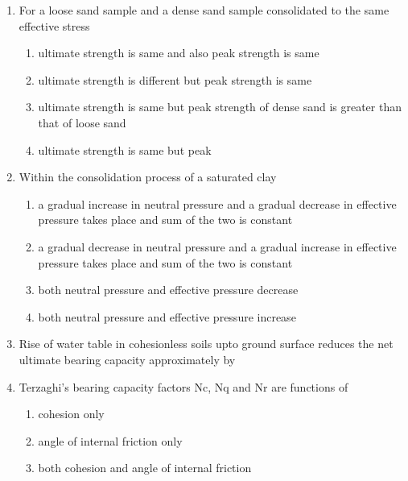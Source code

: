 \documentclass[11pt,a4paper]{article}
\begin{document}
\begin{enumerate}
\item{For a loose sand sample and a dense sand sample consolidated to the same effective stress}
\begin{enumerate}[label=\Alph*.]
\item{ultimate strength is same and also peak strength is same}
\item{ultimate strength is different but peak strength is same}
\item{ultimate strength is same but peak strength of dense sand is greater than that of loose sand}
\item{ultimate strength is same but peak}
\end{enumerate}
\item{Within the consolidation process of a saturated clay}
\begin{enumerate}[label=\Alph*.]
\item{a gradual increase in neutral pressure and a gradual decrease in effective pressure takes place and sum of the two is constant}
\item{a gradual decrease in neutral pressure and a gradual increase in effective pressure takes place and sum of the two is constant}
\item{both neutral pressure and effective pressure decrease}
\item{both neutral pressure and effective pressure increase}
\end{enumerate}
\item{Rise of water table in cohesionless soils upto ground surface reduces the net ultimate bearing capacity approximately by}
\\
\item{Terzaghi's bearing capacity factors Nc, Nq and Nr are functions of
}
\begin{enumerate}[label=\Alph*.]
\item{cohesion only}
\item{angle of internal friction only}
\item{both cohesion and angle of internal friction}

\end{enumerate}
\end{enumerate}
\end{document}
